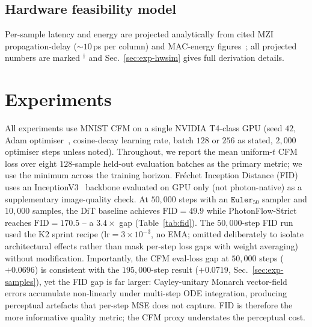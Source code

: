 \documentclass[conference]{IEEEtran}
\begin{document}
\subsection{Hardware feasibility model}
\label{sec:method-hwsim}
Per-sample latency and energy are projected analytically from
cited MZI propagation-delay (${\sim}10$\,ps per column) and
MAC-energy figures~\cite{shen2017,ning2024,clements2016};
all projected numbers are marked $^\dagger$ and
Sec.~\ref{sec:exp-hwsim} gives full derivation details.

\section{Experiments}
\label{sec:exp}

All experiments use MNIST CFM on a single NVIDIA T4-class GPU
(seed $42$, Adam optimiser~\cite{kingma2015}, cosine-decay learning rate, batch
$128$ or $256$ as stated, $2{,}000$ optimiser steps unless noted).
Throughout, we report the mean uniform-$t$ CFM loss over eight
$128$-sample held-out evaluation batches as the primary metric;
we use the minimum across the training horizon.  Fr\'{e}chet
Inception Distance (FID)~\cite{heusel2017} uses an
InceptionV3~\cite{szegedy2016} backbone evaluated
on GPU only (not photon-native) as a supplementary image-quality
check.  At $50{,}000$ steps with an $\texttt{Euler}_{50}$ sampler
and $10{,}000$ samples, the DiT baseline achieves
$\mathrm{FID}{=}49.9$ while PhotonFlow-Strict reaches
$\mathrm{FID}{=}170.5$ -- a $3.4{\times}$ gap
(Table~\ref{tab:fid}).  The $50{,}000$-step FID run used the K2
sprint recipe ($\mathrm{lr}{=}3{\times}10^{-3}$, no EMA; omitted
deliberately to isolate architectural effects rather than mask
per-step loss gaps with weight averaging) without modification.  Importantly, the CFM eval-loss gap at $50{,}000$ steps
($+0.0696$) is consistent with the $195{,}000$-step result
($+0.0719$, Sec.~\ref{sec:exp-samples}), yet the FID gap is far
larger: Cayley-unitary Monarch vector-field errors accumulate
non-linearly under multi-step ODE integration, producing
perceptual artefacts that per-step MSE does not capture.  FID is
therefore the more informative quality metric; the CFM proxy
understates the perceptual cost.
\end{document}
